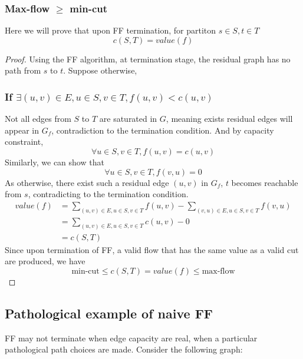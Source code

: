 \documentclass[10pt]{article}
\theoremstyle{definition}
\begin{document}
\subsubsection*{Max-flow $\geq$ min-cut}
Here we will prove that upon FF termination, for partiton $s \in S, t \in T$ 
\[c(S, T) = value(f)\]
\begin{proof}
Using the FF algorithm, at termination stage, the residual graph has no path from $s$ to $t$.     
Suppose otherwise, 
\subsubsection*{If $\exists (u, v)\in E, u\in S, v\in T, f(u, v) < c(u, v)$}
Not all edges from $S$ to $T$ are saturated in $G$, meaning exists residual edges will appear in $G_f$, contradiction to the termination condition.
And by capacity constraint, 
\[\forall u \in S, v\in T, f(u, v) = c(u, v)\]
Similarly, we can show that 
\[\forall u \in S, v\in T, f(v, u) = 0\]
As otherwise, there exist such a residual edge $(u, v)$ in $G_f$, $t$ becomes reachable from $s$, contradicting to the termination condition.
\begin{align*}
  value(f) &= \sum_{(u,v) \in E, u \in S, v\in T} f(u, v) - \sum_{(v, u) \in E, u \in S, v\in T} f(v, u)\\
  &= \sum_{(u,v) \in E, u \in S, v\in T} c(u, v) - 0\\
  &= c(S, T)
\end{align*}
Since upon termination of FF, a valid flow that has the same value as a valid cut are produced, we have 
\[\text{min-cut} \leq c(S, T) = value(f) \leq \text{max-flow}\]
\end{proof}

\subsection{Pathological example of naive FF}
FF may not terminate when edge capacity are real, when a particular pathological path choices are made. Consider the following graph:
\usetikzlibrary{arrows.meta,positioning}
\end{document}
